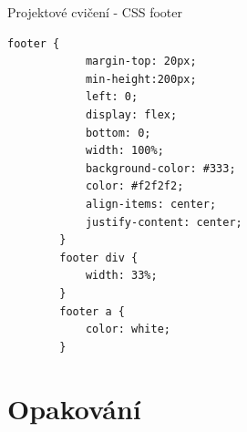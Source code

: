 \documentclass{beamer}
\begin{document}
\begin{frame}[fragile, shrink=0]{Projektové cvičení - CSS footer}

\begin{lstlisting}[language=HTML]
footer {
            margin-top: 20px;
            min-height:200px;
            left: 0;
            display: flex;
            bottom: 0;
            width: 100%;
            background-color: #333;
            color: #f2f2f2;
            align-items: center;
            justify-content: center;
        }
        footer div {
            width: 33%;
        }
        footer a {
            color: white;
        }
\end{lstlisting}
	
\end{frame}









	

	
  
	

  
	


\section{Opakování}
\end{document}
